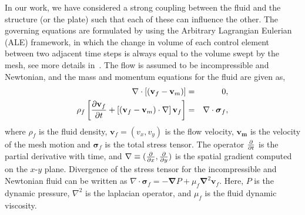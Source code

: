\documentclass[aps,pre,twocolumn,aps,longbibliography]{revtex4-1}
\begin{document}
	In our work, we have considered a strong coupling between the fluid and the structure (or the plate) such that each of these can influence the other. The governing equations are formulated by using the Arbitrary Lagrangian Eulerian (ALE) framework, in which the change in volume of each control element between two adjacent time steps is always equal to the volume swept by the mesh, see more details in~\cite{Nguyen2010, Slone2002, CampbellPaterson2011}. The flow is assumed to be incompressible and Newtonian, and the mass and momentum equations for the fluid are given as,
	\begin{eqnarray}
	\nabla\cdot\left[(\mathbf{v}_f-\mathbf{v}_m)\right] &=& 0, \\
	\rho_f\left[{\partial\mathbf{v}_f\over\partial t}+\left[(\mathbf{v}_f-\mathbf{v}_m)\cdot\mathbf{\nabla}\right]\mathbf{v}_f\right] &=& \mathbf{\nabla}\cdot\mathbf{\boldsymbol{\sigma}}_f,
	\end{eqnarray}
	where $\rho_f$ is the fluid density, $\mathbf{v}_f=(v_x,v_y)$ is the flow velocity, $\mathbf{v_m}$ is the velocity of the mesh motion and $\boldsymbol{\sigma}_f$ is the total stress tensor. The operator ${\partial\over\partial t}$ is the partial derivative with time, and $\mathbf{\nabla}\equiv ({\partial\over\partial x},{\partial\over\partial y})$ is the spatial gradient computed on the $x$-$y$ plane. Divergence of the stress tensor for the incompressible and Newtonian fluid can be written as $\nabla\cdot\boldsymbol{\sigma}_f=-\mathbf{\nabla}P+\mu_f\mathbf{\nabla}^2\mathbf{v}_f$. Here, $P$ is the dynamic pressure, $\nabla^2$ is the laplacian operator, and $\mu_f$ is the fluid dynamic viscosity. 
	
	
	
\end{document}
